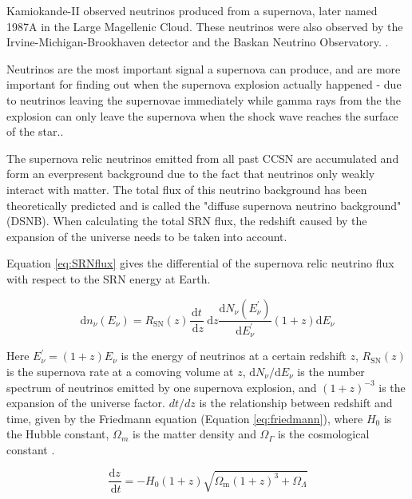 Kamiokande-II observed neutrinos produced from a supernova, later named 1987A in the Large Magellenic Cloud. These neutrinos were also observed by the Irvine-Michigan-Brookhaven detector and the Baskan Neutrino Observatory. \cite{hirata_observation_1987}.

Neutrinos are the most important signal a supernova can produce, and are more important for finding out when the supernova explosion actually happened - due to neutrinos leaving the supernovae immediately while gamma rays from the the explosion can only leave the supernova when the shock wave reaches the surface of the star.\cite{bethe_supernova_1990}.

The supernova relic neutrinos emitted from all past CCSN are accumulated and form an everpresent background due to the fact that neutrinos only weakly interact with matter. The total flux of this neutrino background has been theoretically predicted and is called the "diffuse supernova neutrino background" (DSNB). When calculating the total SRN flux, the redshift caused by the expansion of the universe needs to be taken into account.

Equation \ref{eq:SRNflux} gives the differential of the supernova relic neutrino flux with respect to the SRN energy at Earth.

\begin{equation}
\mathrm{d} n_{\nu}\left(E_{\nu}\right)=R_{\mathrm{SN}}(z) \frac{\mathrm{d} t}{\mathrm{~d} z} \mathrm{~d} z \frac{\mathrm{d} N_{\nu}\left(E_{\nu}^{\prime}\right)}{\mathrm{d} E_{\nu}^{\prime}}(1+z) \mathrm{d} E_{\nu}
\label{eq:SRNflux}
\end{equation}

Here $E_{\nu}^{\prime}=(1+z) E_{\nu}$ is the energy of neutrinos at a certain redshift $z$, $R_{\mathrm{SN}}(z)$ is the supernova rate at a comoving volume at $z$, $\mathrm{d} N_{\nu} / \mathrm{d} E_{\nu}$ is the number spectrum of neutrinos emitted by one supernova explosion, and $(1+z)^{-3}$ is the expansion of the universe factor. $dt/dz$ is the relationship between redshift and time, given by the Friedmann equation (Equation \ref{eq:friedmann}), where $H_{0}$ is the Hubble constant, $\Omega_{m}$ is the matter density and $\Omega_{\Gamma}$ is the cosmological constant \cite{ando_relic_2004}.

\begin{equation}
\frac{\mathrm{d} z}{\mathrm{~d} t}=-H_{0}(1+z) \sqrt{\Omega_{\mathrm{m}}(1+z)^{3}+\Omega_{\Lambda}}
\label{eq:friedmann}
\end{equation}



